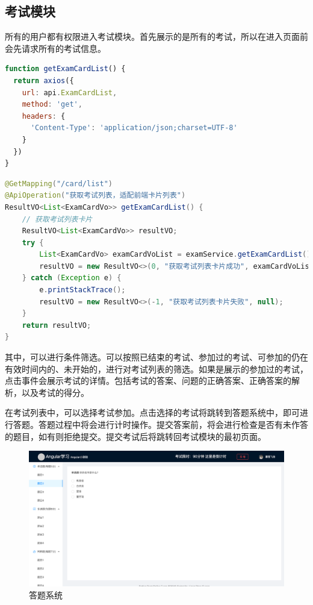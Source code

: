 \subsection{考试模块}
所有的用户都有权限进入考试模块。首先展示的是所有的考试，所以在进入页面前会先请求所有的考试信息。
\begin{lstlisting}[language=JavaScript]
function getExamCardList() {
  return axios({
    url: api.ExamCardList,
    method: 'get',
    headers: {
      'Content-Type': 'application/json;charset=UTF-8'
    }
  })
}
\end{lstlisting}
\begin{lstlisting}[language=Java]
@GetMapping("/card/list")
@ApiOperation("获取考试列表，适配前端卡片列表")
ResultVO<List<ExamCardVo>> getExamCardList() {
    // 获取考试列表卡片
    ResultVO<List<ExamCardVo>> resultVO;
    try {
        List<ExamCardVo> examCardVoList = examService.getExamCardList();
        resultVO = new ResultVO<>(0, "获取考试列表卡片成功", examCardVoList);
    } catch (Exception e) {
        e.printStackTrace();
        resultVO = new ResultVO<>(-1, "获取考试列表卡片失败", null);
    }
    return resultVO;
}
\end{lstlisting}
其中，可以进行条件筛选。可以按照已结束的考试、参加过的考试、可参加的仍在有效时间内的、未开始的，进行对考试列表的筛选。如果是展示的参加过的考试，点击事件会展示考试的详情。包括考试的答案、问题的正确答案、正确答案的解析，以及考试的得分。

在考试列表中，可以选择考试参加。点击选择的考试将跳转到答题系统中，即可进行答题。答题过程中将会进行计时操作。提交答案前，将会进行检查是否有未作答的题目，如有则拒绝提交。提交考试后将跳转回考试模块的最初页面。

\begin{figure}[htb]
    \centering
    \includegraphics[width=\linewidth]{_images/答题系统.png}
    \caption{答题系统}
\end{figure}

